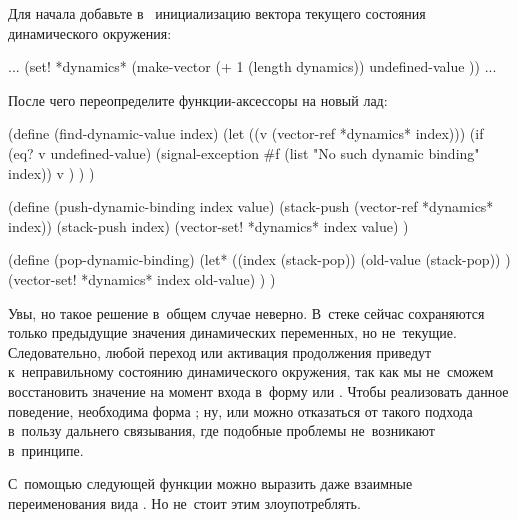 
Для начала добавьте в~ инициализацию вектора текущего состояния
динамического окружения:

\begin{code:lisp}
... (set! *dynamics* (make-vector (+ 1 (length dynamics))
                                  undefined-value )) ...
\end{code:lisp}

\noindent
После чего переопределите функции-аксессоры на новый лад:

\begin{code:lisp}
(define (find-dynamic-value index)
  (let ((v (vector-ref *dynamics* index)))
    (if (eq? v undefined-value)
        (signal-exception #f (list "No such dynamic binding" index))
        v ) ) )

(define (push-dynamic-binding index value)
  (stack-push (vector-ref *dynamics* index))
  (stack-push index)
  (vector-set! *dynamics* index value) )

(define (pop-dynamic-binding)
  (let* ((index (stack-pop))
         (old-value (stack-pop)) )
    (vector-set! *dynamics* index old-value) ) )
\end{code:lisp}

Увы, но такое решение в~общем случае неверно. В~стеке сейчас сохраняются только
предыдущие значения динамических переменных, но не~текущие. Следовательно, любой
переход или активация продолжения приведут к~неправильному состоянию
динамического окружения, так как мы не~сможем восстановить значение
 на момент входа в~форму  или . Чтобы
реализовать данное поведение, необходима форма ; ну, или
можно отказаться от такого подхода в~пользу дальнего связывания, где подобные
проблемы не~возникают в~принципе.



С~помощью следующей функции можно выразить даже взаимные переименования вида
. Но не~стоит этим злоупотреблять.

